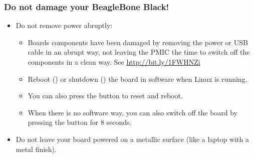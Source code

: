 \begin{frame}
\frametitle{Do not damage your BeagleBone Black!}
\begin{itemize}
  \item Do not remove power abruptly:
  \begin{itemize}
     \item Boards components have been damaged by removing the power or
           USB cable in an abrupt way, not leaving the PMIC the time to
           switch off the components in a clean way. See
           \url{http://bit.ly/1FWHNZi}
     \item Reboot () or shutdown () the board
	   in software when Linux is running.
     \item You can also press the  button to reset and
	   reboot.
     \item When there is no software way, you can also switch off
	   the board by pressing the  button for 8 seconds.
  \end{itemize}
  \item Do not leave your board powered on a metallic surface (like a
        laptop with a metal finish).
\end{itemize}
\end{frame}
